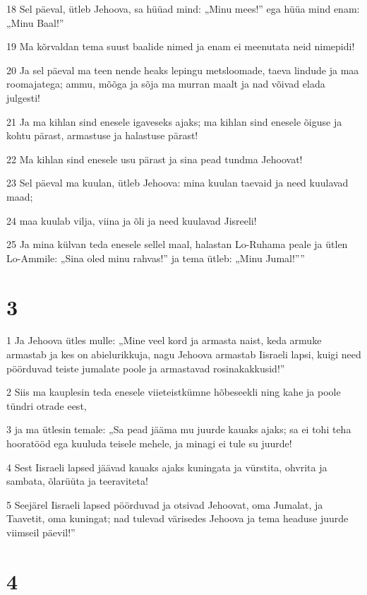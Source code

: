 \par 18 Sel päeval, ütleb Jehoova, sa hüüad mind: „Minu mees!” ega hüüa mind enam: „Minu Baal!”
\par 19 Ma kõrvaldan tema suust baalide nimed ja enam ei meenutata neid nimepidi!
\par 20 Ja sel päeval ma teen nende heaks lepingu metsloomade, taeva lindude ja maa roomajatega; ammu, mõõga ja sõja ma murran maalt ja nad võivad elada julgesti!
\par 21 Ja ma kihlan sind enesele igaveseks ajaks; ma kihlan sind enesele õiguse ja kohtu pärast, armastuse ja halastuse pärast!
\par 22 Ma kihlan sind enesele usu pärast ja sina pead tundma Jehoovat!
\par 23 Sel päeval ma kuulan, ütleb Jehoova: mina kuulan taevaid ja need kuulavad maad;
\par 24 maa kuulab vilja, viina ja õli ja need kuulavad Jisreeli!
\par 25 Ja mina külvan teda enesele sellel maal, halastan Lo-Ruhama peale ja ütlen Lo-Ammile: „Sina oled minu rahvas!” ja tema ütleb: „Minu Jumal!””

\chapter{3}

\par 1 Ja Jehoova ütles mulle: „Mine veel kord ja armasta naist, keda armuke armastab ja kes on abielurikkuja, nagu Jehoova armastab Iisraeli lapsi, kuigi need pöörduvad teiste jumalate poole ja armastavad rosinakakkusid!”
\par 2 Siis ma kauplesin teda enesele viieteistkümne hõbeseekli ning kahe ja poole tündri otrade eest,
\par 3 ja ma ütlesin temale: „Sa pead jääma mu juurde kauaks ajaks; sa ei tohi teha hooratööd ega kuuluda teisele mehele, ja minagi ei tule su juurde!
\par 4 Sest Iisraeli lapsed jäävad kauaks ajaks kuningata ja vürstita, ohvrita ja sambata, õlarüüta ja teeraviteta!
\par 5 Seejärel Iisraeli lapsed pöörduvad ja otsivad Jehoovat, oma Jumalat, ja Taavetit, oma kuningat; nad tulevad värisedes Jehoova ja tema headuse juurde viimseil päevil!”

\chapter{4}

